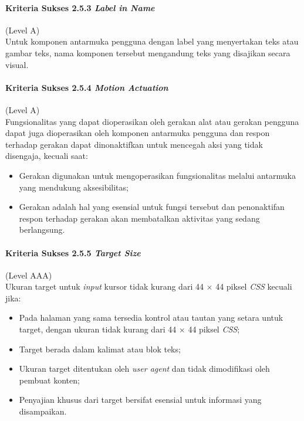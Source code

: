 \paragraph{Kriteria Sukses 2.5.3 \textit{Label in Name}}
\label{sec:kriteria_sukses_2.5.3}
(Level A)\\

Untuk komponen antarmuka pengguna dengan label yang menyertakan teks atau gambar teks, nama komponen tersebut mengandung teks yang disajikan secara visual. 

\paragraph{Kriteria Sukses 2.5.4 \textit{Motion Actuation}}
\label{sec:kriteria_sukses_2.5.4}
(Level A)\\

Fungsionalitas yang dapat dioperasikan oleh gerakan alat atau gerakan pengguna dapat juga dioperasikan oleh komponen antarmuka pengguna dan respon terhadap gerakan dapat dinonaktifkan untuk mencegah aksi yang tidak disengaja, kecuali saat:
\begin{itemize}
	\item Gerakan digunakan untuk mengoperasikan fungsionalitas melalui antarmuka yang mendukung aksesibilitas;
	\item Gerakan adalah hal yang esensial untuk fungsi tersebut dan penonaktifan respon terhadap gerakan akan membatalkan aktivitas yang sedang berlangsung.
\end{itemize}

\paragraph{Kriteria Sukses 2.5.5 \textit{Target Size}}
\label{sec:kriteria_sukses_2.5.5}
(Level AAA)\\

Ukuran target untuk \textit{input} kursor tidak kurang dari 44 $\times$ 44 piksel \textit{CSS} kecuali jika:

\begin{itemize}
	\item Pada halaman yang sama tersedia kontrol atau tautan yang setara untuk target, dengan ukuran tidak kurang dari 44 $\times$ 44 piksel \textit{CSS};  
	\item Target berada dalam kalimat atau blok teks;
	\item Ukuran target ditentukan oleh \textit{user agent} dan tidak dimodifikasi oleh pembuat konten;
	\item Penyajian khusus dari target bersifat esensial untuk informasi yang disampaikan.
\end{itemize}

